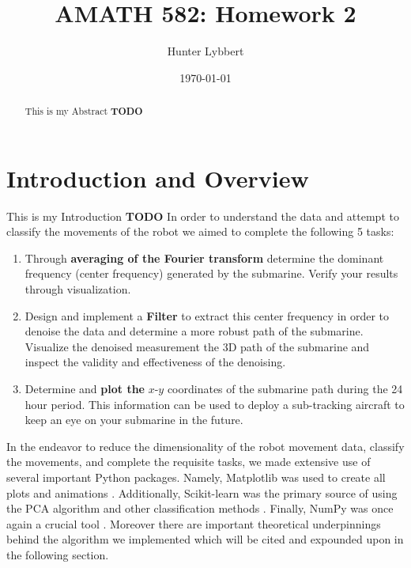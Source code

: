 \documentclass[11pt]{amsart}
\title{AMATH 582: Homework 2}
\author{Hunter Lybbert} %
\date{\today} %
\begin{document}
\maketitle

\begin{abstract}
    This is my Abstract \textbf{TODO}
\end{abstract}

\section{Introduction and Overview}\label{sec:Introduction}
This is my Introduction \textbf{TODO}
In order to understand the data and attempt to classify the movements of the robot we aimed to complete the following 5 tasks: \\
\begin{enumerate}
\item Through \textbf{averaging of the Fourier transform} determine the dominant frequency (center frequency)
generated by the submarine. Verify your results through visualization. \\

\item Design and implement a \textbf{Filter} to extract this center frequency in order to denoise the data and
determine a more robust path of the submarine. Visualize the denoised measurement the 3D path of
the submarine and inspect the validity and effectiveness of the denoising. \\

\item Determine and \textbf{plot the} $x$-$y$ coordinates of the submarine path during the 24 hour period. This
information can be used to deploy a sub-tracking aircraft to keep an eye on your submarine in the future.

\end{enumerate}

In the endeavor to reduce the dimensionality of the robot movement data, classify the movements, and complete the requisite tasks, we made extensive use of several important Python packages.
Namely, Matplotlib was used to create all plots and animations \cite{Hunter:2007}.
Additionally, Scikit-learn was the primary source of using the PCA algorithm and other classification methods \cite{scikit-learn}. 
Finally, NumPy was once again a crucial tool \cite{harris2020array}.
Moreover there are important theoretical underpinnings behind the algorithm we implemented which will be cited and expounded upon in the following section.
\end{document}
